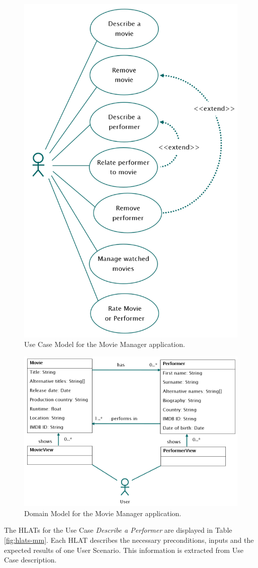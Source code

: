 \begin{figure}[H]
	\centering
	\includegraphics[width=.5\textwidth]{../images/ElAttarUseCase.png}
	\caption{Use Case Model for the Movie Manager application.}
	\label{fig:use-case-mm}
\end{figure}



\begin{figure}[H]
	\centering
	\includegraphics[width=.8\textwidth]{../images/ElAttarDomain.png}
	\caption{Domain Model for the Movie Manager application.}
	\label{fig:domain-mm}
\end{figure}



The HLATs for the Use Case \textit{Describe a Performer} are displayed in Table \ref{fig:hlats-mm}.
Each HLAT describes the necessary preconditions, inputs and the expected results of one User Scenario.
This information is extracted from Use Case description.


